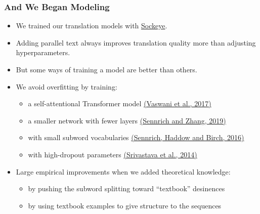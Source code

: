 \documentclass{beamer}
\begin{document}

\begin{frame}
  \frametitle{And We Began Modeling}
  \vspace{-1.0em}
  \begin{itemize}
  \item We trained our translation models with \href{https://awslabs.github.io/sockeye/}{Sockeye}.
  \vspace{0.25em}
  \item Adding parallel text always improves translation quality more than adjusting hyperparameters.
  \vspace{0.25em}
  \item But some ways of training a model are better than others.
  \vspace{0.25em}
  \item We avoid overfitting by training:
    \begin{itemize}
    \item a self-attentional Transformer model \href{https://arxiv.org/abs/1706.03762}{(Vaswani et al., 2017)}%
    \item a smaller network with fewer layers \href{https://arxiv.org/abs/1905.11901}{(Sennrich and Zhang, 2019)}
    \item with small subword vocabularies \href{https://arxiv.org/abs/1508.07909}{(Sennrich, Haddow and Birch, 2016)}
    \item with high-dropout parameters \href{http://jmlr.org/papers/v15/srivastava14a.html}{(Srivastava et al., 2014)}
    \end{itemize}
  \vspace{0.25em}
  \item Large empirical improvements when we added theoretical knowledge:
    \begin{itemize}
    \item by pushing the subword splitting toward ``textbook'' desinences
    \item by using textbook examples to give structure to the sequences
    \end{itemize}
  \end{itemize}
\end{frame}

\end{document}
